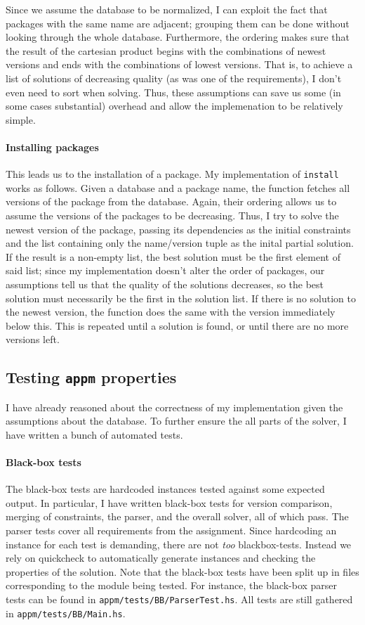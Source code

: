 Since we assume the database to be normalized, I can exploit the fact that packages with the same name are adjacent; grouping them can be done without looking through the whole database. Furthermore, the ordering makes sure that the result of the cartesian product begins with the combinations of newest versions and ends with the combinations of lowest versions. That is, to achieve a list of solutions of decreasing quality (as was one of the requirements), I don't even need to sort when solving. Thus, these assumptions can save us some (in some cases substantial) overhead and allow the implemenation to be relatively simple.


\paragraph{Installing packages}
This leads us to the installation of a package. My implementation of \texttt{install} works as follows. Given a database and a package name, the function fetches all versions of the package from the database. Again, their ordering allows us to assume the versions of the packages to be decreasing. Thus, I try to solve the newest version of the package, passing its dependencies as the initial constraints and the list containing only the name/version tuple as the inital partial solution. If the result is a non-empty list, the best solution must be the first element of said list; since my implementation doesn't alter the order of packages, our assumptions tell us that the quality of the solutions decreases, so the best solution must necessarily be the first in the solution list. If there is no solution to the newest version, the function does the same with the version immediately below this. This is repeated until a solution is found, or until there are no more versions left.


\subsection*{Testing \texttt{appm} properties}
I have already reasoned about the correctness of my implementation given the assumptions about the database. To further ensure the all parts of the solver, I have written a bunch of automated tests.

\paragraph{Black-box tests}
The black-box tests are hardcoded instances tested against some expected output. In particular, I have written black-box tests for version comparison, merging of constraints, the parser, and the overall solver, all of which pass. The parser tests cover all requirements from the assignment. Since hardcoding an instance for each test is demanding, there are not \textit{too} blackbox-tests. Instead we rely on quickcheck to automatically generate instances and checking the properties of the solution. Note that the black-box tests have been split up in files corresponding to the module being tested. For instance, the black-box parser tests can be found in \texttt{appm/tests/BB/ParserTest.hs}. All tests are still gathered in \texttt{appm/tests/BB/Main.hs}.

